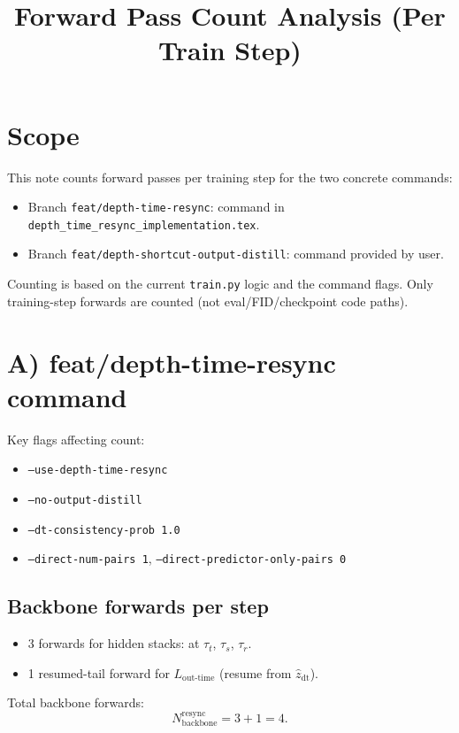 \documentclass[11pt]{article}
\title{Forward Pass Count Analysis (Per Train Step)}
\date{}
\begin{document}
\maketitle

\section{Scope}

This note counts forward passes per training step for the two concrete commands:
\begin{itemize}[leftmargin=*]
  \item Branch \texttt{feat/depth-time-resync}: command in \texttt{depth\_time\_resync\_implementation.tex}.
  \item Branch \texttt{feat/depth-shortcut-output-distill}: command provided by user.
\end{itemize}

Counting is based on the current \texttt{train.py} logic and the command flags.
Only training-step forwards are counted (not eval/FID/checkpoint code paths).

\section{A) feat/depth-time-resync command}

Key flags affecting count:
\begin{itemize}[leftmargin=*]
  \item \texttt{--use-depth-time-resync}
  \item \texttt{--no-output-distill}
  \item \texttt{--dt-consistency-prob 1.0}
  \item \texttt{--direct-num-pairs 1}, \texttt{--direct-predictor-only-pairs 0}
\end{itemize}

\subsection*{Backbone forwards per step}
\begin{itemize}[leftmargin=*]
  \item 3 forwards for hidden stacks: at \(\tau_t\), \(\tau_s\), \(\tau_r\).
  \item 1 resumed-tail forward for \(L_{\text{out-time}}\) (resume from \(\hat z_{\text{dt}}\)).
\end{itemize}
Total backbone forwards:
\[
N_{\text{backbone}}^{\text{resync}} = 3 + 1 = 4.
\]
\end{document}
